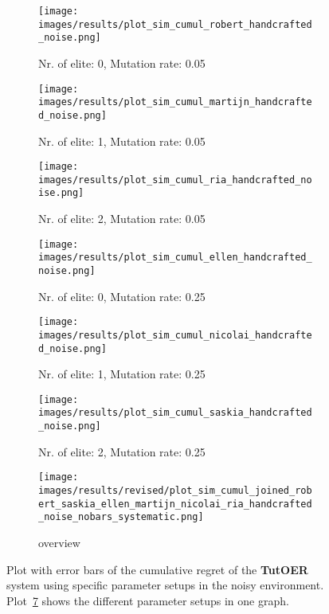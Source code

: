 
\begin{figure}[ht]
	\begin{subfigure}{0.48\linewidth}
	\texttt{[image: images/results/plot\_sim\_cumul\_robert\_handcrafted\_noise.png]}
	\caption{Nr. of elite: 0, Mutation rate: 0.05}
	\label{fig:cumul_handcrafted_noise_robert}
	\end{subfigure}
	\hfill
	\begin{subfigure}{0.48\linewidth}
	\texttt{[image: images/results/plot\_sim\_cumul\_martijn\_handcrafted\_noise.png]}
	\caption{Nr. of elite: 1, Mutation rate: 0.05}
	\label{fig:cumul_handcrafted_noise_martijn}
	\end{subfigure}
	\begin{subfigure}{0.48\linewidth}
	\texttt{[image: images/results/plot\_sim\_cumul\_ria\_handcrafted\_noise.png]}
	\caption{Nr. of elite: 2, Mutation rate: 0.05}
	\label{fig:cumul_handcrafted_noise_ria}
	\end{subfigure}
	\hfill
	\begin{subfigure}{0.48\linewidth}
	\texttt{[image: images/results/plot\_sim\_cumul\_ellen\_handcrafted\_noise.png]}
	\caption{Nr. of elite: 0, Mutation rate: 0.25}
	\label{fig:cumul_handcrafted_noise_ellen}
	\end{subfigure}
	\begin{subfigure}{0.48\linewidth}
	\texttt{[image: images/results/plot\_sim\_cumul\_nicolai\_handcrafted\_noise.png]}
	\caption{Nr. of elite: 1, Mutation rate: 0.25}
	\label{fig:cumul_handcrafted_noise_nicolai}
	\end{subfigure}
	\hfill
	\begin{subfigure}{0.48\linewidth}
	\texttt{[image: images/results/plot\_sim\_cumul\_saskia\_handcrafted\_noise.png]}
	\caption{Nr. of elite: 2, Mutation rate: 0.25}
	\label{fig:cumul_handcrafted_noise_saskia}
	\end{subfigure}
	\begin{subfigure}{\linewidth}
	\texttt{[image: images/results/revised/plot\_sim\_cumul\_joined\_robert\_saskia\_ellen\_martijn\_nicolai\_ria\_handcrafted\_noise\_nobars\_systematic.png]}
	\caption{overview}
	\label{fig:cumul_handcrafted_noise_overview_group2}
	\end{subfigure}
	\caption[Cumulative regret in noisy simulated environment for group 2]{Plot with error bars of the cumulative regret of the \textbf{TutOER}
	system using specific parameter setups in the noisy environment.
	Plot~\ref{fig:cumul_handcrafted_noise_overview_group2} shows the
	different parameter setups in one graph.}
	\label{fig:cumul_handcrafted_noise_container_group2}
\end{figure}

